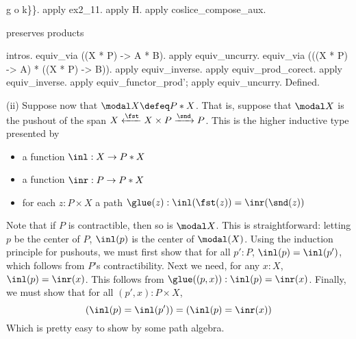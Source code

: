 \begin{coqdoccode}
\begin{coqdoccomment}
g\coqdocindent{0.50em}
o\coqdocindent{0.50em}
k\}\}.\coqdoceol
\coqdocindent{1.00em}
apply\coqdocindent{0.50em}
ex2\_11.\coqdocindent{0.50em}
\coqdoceol
\coqdocindent{1.00em}
apply\coqdocindent{0.50em}
H.\coqdoceol
\coqdocindent{1.00em}
apply\coqdocindent{0.50em}
coslice\_compose\_aux.\coqdoceol
\coqdoceol
\coqdocindent{1.00em}
\begin{coqdoccomment}
\coqdocindent{0.50em}
preserves\coqdocindent{0.50em}
products\coqdocindent{0.50em}
\end{coqdoccomment}
\coqdoceol
\coqdocindent{1.00em}
intros.\coqdoceol
\coqdocindent{1.00em}
equiv\_via\coqdocindent{0.50em}
((X\coqdocindent{0.50em}
*\coqdocindent{0.50em}
P)\coqdocindent{0.50em}
->\coqdocindent{0.50em}
A\coqdocindent{0.50em}
*\coqdocindent{0.50em}
B).\coqdocindent{0.50em}
apply\coqdocindent{0.50em}
equiv\_uncurry.\coqdoceol
\coqdocindent{1.00em}
equiv\_via\coqdocindent{0.50em}
(((X\coqdocindent{0.50em}
*\coqdocindent{0.50em}
P)\coqdocindent{0.50em}
->\coqdocindent{0.50em}
A)\coqdocindent{0.50em}
*\coqdocindent{0.50em}
((X\coqdocindent{0.50em}
*\coqdocindent{0.50em}
P)\coqdocindent{0.50em}
->\coqdocindent{0.50em}
B)).\coqdocindent{0.50em}
\coqdoceol
\coqdocindent{1.00em}
apply\coqdocindent{0.50em}
equiv\_inverse.\coqdocindent{0.50em}
apply\coqdocindent{0.50em}
equiv\_prod\_corect.\coqdoceol
\coqdocindent{1.00em}
apply\coqdocindent{0.50em}
equiv\_inverse.\coqdocindent{0.50em}
\coqdoceol
\coqdocindent{1.00em}
apply\coqdocindent{0.50em}
equiv\_functor\_prod';\coqdocindent{0.50em}
apply\coqdocindent{0.50em}
equiv\_uncurry.\coqdoceol
Defined.\coqdoceol
\end{coqdoccomment}
\coqdoceol
\coqdocemptyline
\end{coqdoccode}
(ii)
Suppose now that $\modal X \defeq P * X$.  That is, suppose that $\modal X$ is
the pushout of the span $X \xleftarrow{\fst} X \times P \xrightarrow{\snd}
P$.  This is the higher inductive type presented by



\begin{itemize}
\item  a function $\inl : X \to P * X$

\item  a function $\inr : P \to P * X$

\item  for each $z : P \times X$ a path $\glue(z) : \inl(\fst(z)) = \inr(\snd(z))$

\end{itemize}
Note that if $P$ is contractible, then so is $\modal X$.  This is
straightforward: letting $p$ be the center of $P$, $\inl(p)$ is the center of
$\modal(X)$.  Using the induction principle for pushouts, we must first show
that for all $p' : P$, $\inl(p) = \inl(p')$, which follows from $P$'s
contractibility.  Next we need, for any $x : X$, $\inl(p) = \inr(x)$.  This
follows from $\glue((p, x)) : \inl(p) = \inr(x)$.  Finally, we must show that
for all $(p', x) : P \times X$, 
\[
  (\inl(p) = \inl(p')) = (\inl(p) = \inr(x))
\]
Which is pretty easy to show by some path algebra.


